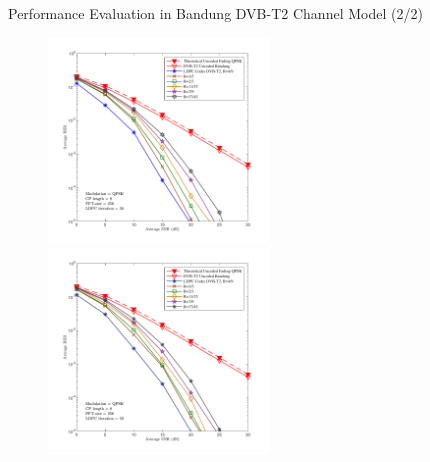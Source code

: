 \documentclass[11pt, aspectratio=169]{beamer}
\begin{document}
\begin{frame}{Performance Evaluation in Bandung DVB-T2 Channel Model (2/2)}
	
				\vspace{-0.2cm}
	
	\begin{figure}
		\centering
		\vspace{-0.25cm}
		\begin{minipage}{.5\linewidth}
			\hspace{1cm}
			\includegraphics[width=2.3in]{hasilOFDMpegfix.pdf}
			\vspace{-0.5cm}
			
		\end{minipage}
		\hfill 	
		\hspace{ -1in}
		\begin{minipage}{.5\linewidth}
			\hspace{1cm}
			\includegraphics[width=2.3in]{hasilOFDMpegfixLDGM.pdf}
			

\end{minipage}
\end{figure}
\end{frame}
\end{document}
